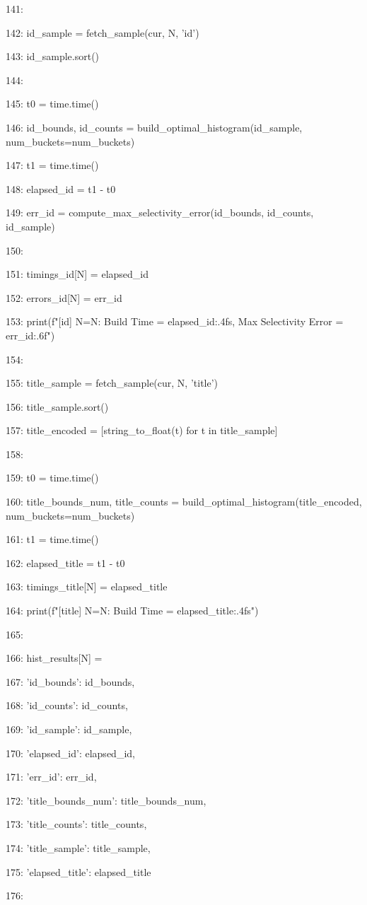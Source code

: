 \documentclass[11pt,a4paper]{article}
\begin{document}
141:

142:         id\_sample = fetch\_sample(cur, N, 'id')

143:         id\_sample.sort()

144:

145:         t0 = time.time()

146:         id\_bounds, id\_counts = build\_optimal\_histogram(id\_sample, num\_buckets=num\_buckets)

147:         t1 = time.time()

148:         elapsed\_id = t1 - t0

149:         err\_id = compute\_max\_selectivity\_error(id\_bounds, id\_counts, id\_sample)

150:

151:         timings\_id[N] = elapsed\_id

152:         errors\_id[N] = err\_id

153:         print(f"[id] N={N}: Build Time = {elapsed\_id:.4f}s, Max Selectivity Error = {err\_id:.6f}")

154:

155:         title\_sample = fetch\_sample(cur, N, 'title')

156:         title\_sample.sort()

157:         title\_encoded = [string\_to\_float(t) for t in title\_sample]

158:

159:         t0 = time.time()

160:         title\_bounds\_num, title\_counts = build\_optimal\_histogram(title\_encoded, num\_buckets=num\_buckets)

161:         t1 = time.time()

162:         elapsed\_title = t1 - t0

163:         timings\_title[N] = elapsed\_title

164:         print(f"[title] N={N}: Build Time = {elapsed\_title:.4f}s")

165:

166:         hist\_results[N] = {

167:             'id\_bounds': id\_bounds,

168:             'id\_counts': id\_counts,

169:             'id\_sample': id\_sample,

170:             'elapsed\_id': elapsed\_id,

171:             'err\_id': err\_id,

172:             'title\_bounds\_num': title\_bounds\_num,

173:             'title\_counts': title\_counts,

174:             'title\_sample': title\_sample,

175:             'elapsed\_title': elapsed\_title

176:         }
\end{document}
